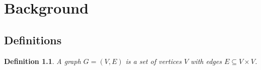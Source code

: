 \chapter{Background}
\label{ch:background}

\section{Definitions}
\newtheorem{definition}{Definition}[chapter]
\begin{definition}
A \emph{graph} $G = (V, E)$ is a set of vertices $V$ with edges $E \subseteq V \times V$.
\end{definition}
